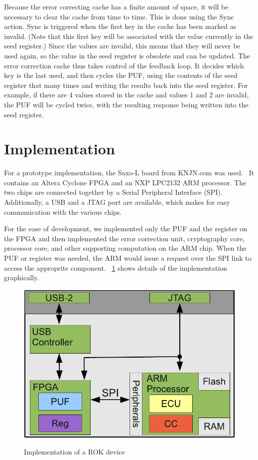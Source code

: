 Because the error correcting cache has a finite amount of space, it will be necessary to clear the cache from time to
time. This is done using the Sync action. Sync is triggered when the first key in the cache has been marked as invalid.
(Note that this first key will be associated with the value currently in the seed register.) Since the values are invalid,
this means that they will never be used again, so the value in the seed register is obsolete and can be updated.
The error correction cache thus takes control of the feedback loop. It decides which key is the last used, and then cycles
the PUF, using the contents of the seed register that many times and writing the results back into the seed register.
For example, if there are 4 values stored in the cache and values 1 and 2 are invalid, the PUF will be cycled twice,
with the resulting response being written into the seed register.

\section{Implementation}
For a prototype implementation, the Saxo-L board from KNJN.com was used.~\cite{KNJN} It contains an Altera
Cyclone FPGA and an NXP LPC2132 ARM processor. The two chips are connected together by a Serial Peripheral
Interface (SPI). Additionally, a USB and a JTAG port are available, which makes for easy communication with the
various chips.

For the ease of development, we implemented only the PUF and the register on the FPGA and then implemented
the error correction unit, cryptography core, processor core, and other supporting computation on the ARM chip. 
When the PUF or register was needed, the ARM would issue a request over the SPI link to access the approprite component.
~\ref{fig:rokimpl} shows details of the implementation graphically.

\begin{figure}[!ht]
\includegraphics[width=500px]{images/rok.pdf}
\label{fig:rokimpl}
\caption{Implementation of a ROK device}
\end{figure}
\FloatBarrier


